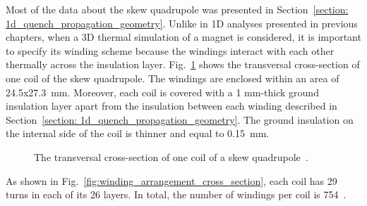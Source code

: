 
Most of the data about the skew quadrupole was presented in Section~\ref{section: 1d_quench_propagation_geometry}. Unlike in 1D analyses presented in previous chapters, when a 3D thermal simulation of a magnet is considered, it is important to specify its winding scheme because the windings interact with each other thermally across the insulation layer. Fig.~\ref{fig:skew_quad_transversal_cross_section} shows the transversal cross-section of one coil of the skew quadrupole. The windings are enclosed within an area of 24.5x27.3~mm. Moreover, each coil is covered with a 1 mm-thick ground insulation layer apart from the insulation between each winding described in Section~\ref{section: 1d_quench_propagation_geometry}. The ground insulation on the internal side of the coil is thinner and equal to 0.15~mm.

\begin{figure}[H]
    \centering
    \caption{The transversal cross-section of one coil of a skew quadrupole~\cite{marco_prioli_mails}.}
    \label{fig:skew_quad_transversal_cross_section}
\end{figure}

As shown in Fig.~\ref{fig:winding_arrangement_cross_section}, each coil has 29 turns in each of its 26 layers. In total, the number of windings per coil is 754~\cite{marco_prioli_mails, hl_lhc_tech_design_report_v01}.

